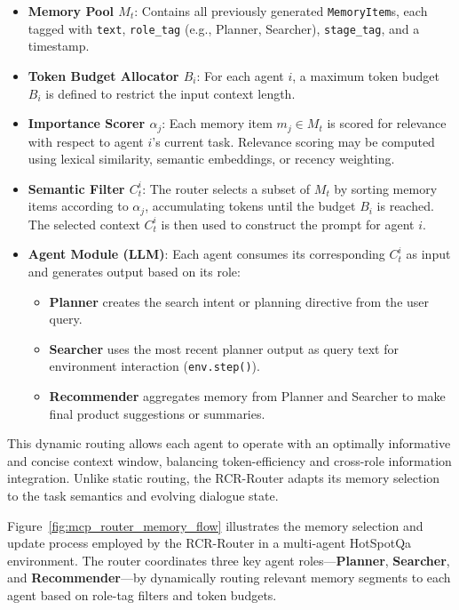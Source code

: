 \begin{itemize}
    \item \textbf{Memory Pool $M_t$}: Contains all previously generated \texttt{MemoryItem}s, each tagged with \texttt{text}, \texttt{role\_tag} (e.g., Planner, Searcher), \texttt{stage\_tag}, and a timestamp.
    
    \item \textbf{Token Budget Allocator $B_i$}: For each agent $i$, a maximum token budget $B_i$ is defined to restrict the input context length.
    
    \item \textbf{Importance Scorer $\alpha_j$}: Each memory item $m_j \in M_t$ is scored for relevance with respect to agent $i$'s current task. Relevance scoring may be computed using lexical similarity, semantic embeddings, or recency weighting.
    
    \item \textbf{Semantic Filter $C_t^i$}: The router selects a subset of $M_t$ by sorting memory items according to $\alpha_j$, accumulating tokens until the budget $B_i$ is reached. The selected context $C_t^i$ is then used to construct the prompt for agent $i$.
    
    \item \textbf{Agent Module (LLM)}: Each agent consumes its corresponding $C_t^i$ as input and generates output based on its role:
    \begin{itemize}
        \item \textbf{Planner} creates the search intent or planning directive from the user query.
        \item \textbf{Searcher} uses the most recent planner output as query text for environment interaction (\texttt{env.step()}).
        \item \textbf{Recommender} aggregates memory from Planner and Searcher to make final product suggestions or summaries.
    \end{itemize}
\end{itemize}

This dynamic routing allows each agent to operate with an optimally informative and concise context window, balancing token-efficiency and cross-role information integration. Unlike static routing, the RCR-Router adapts its memory selection to the task semantics and evolving dialogue state.


Figure~\ref{fig:mcp_router_memory_flow} illustrates the memory selection and update process employed by the RCR-Router in a multi-agent HotSpotQa environment. The router coordinates three key agent roles—\textbf{Planner}, \textbf{Searcher}, and \textbf{Recommender}—by dynamically routing relevant memory segments to each agent based on role-tag filters and token budgets.

